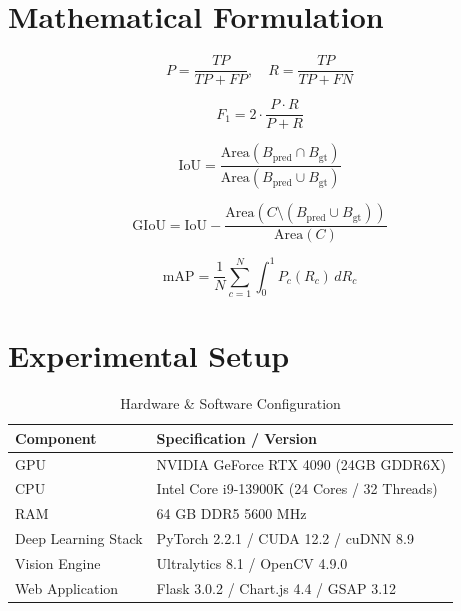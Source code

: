 \documentclass[10pt,journal,compsoc]{IEEEtran}
\begin{document}
\section{Mathematical Formulation}

\begin{equation}
P = \frac{TP}{TP + FP}, \quad R = \frac{TP}{TP + FN}
\end{equation}

\begin{equation}
F_1 = 2 \cdot \frac{P \cdot R}{P + R}
\end{equation}

\begin{equation}
\text{IoU} = \frac{\text{Area}(B_{\text{pred}} \cap B_{\text{gt}})}{\text{Area}(B_{\text{pred}} \cup B_{\text{gt}})}
\end{equation}

\begin{equation}
\text{GIoU} = \text{IoU} - \frac{\text{Area}(C \setminus (B_{\text{pred}} \cup B_{\text{gt}}))}{\text{Area}(C)}
\end{equation}

\begin{equation}
\text{mAP} = \frac{1}{N} \sum_{c=1}^{N} \int_{0}^{1} P_c(R_c) \, dR_c
\end{equation}

\section{Experimental Setup}

\begin{table}[htbp]
\caption{Hardware \& Software Configuration}
\centering
\begin{tabular}{ll}
\toprule
\textbf{Component} & \textbf{Specification / Version} \\
\midrule
GPU & NVIDIA GeForce RTX 4090 (24GB GDDR6X) \\
CPU & Intel Core i9-13900K (24 Cores / 32 Threads) \\
RAM & 64 GB DDR5 5600 MHz \\
Deep Learning Stack & PyTorch 2.2.1 / CUDA 12.2 / cuDNN 8.9 \\
Vision Engine & Ultralytics 8.1 / OpenCV 4.9.0 \\
Web Application & Flask 3.0.2 / Chart.js 4.4 / GSAP 3.12 \\
\bottomrule
\end{tabular}
\end{table}
\end{document}
